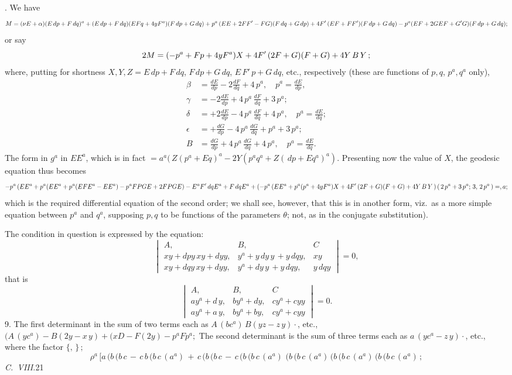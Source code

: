 \documentclass[11pt,a4paper]{book}
\begin{document}
. We have
\[
M = (\nu E + \alpha)(E\,dp + F\,dq)^a + (E\,dp + F\,dq)(EFq + 4yF^a)(F\,dp + G\,dq)\\
+ p^a\,(E E + 2 F F'-F G)(F\,dq + G\,dp)\\
+ 4F'\,(EF + F F')(F\,dp + G\,dq)\\
- p^a(EF + 2 G E F + G' G)(F\,dp + G\,dq);
\]
or say
\[
2M = (-p^a + Fp + 4yF^a) X + 4F'\,(2F + G)(F + G)\\
+ 4 Y\, B\, Y\,;
\]
where, putting for shortness $X, Y, Z = E\,dp + F\,dq$, $F\,dp + G\,dq$, $E\,F'\,p + G\,dq$, etc.,
respectively (these are functions of $p, q$, $p^a, q^a$ only),
\begin{align*}
\beta &= \frac{dE}{dp} - 2\frac{dF}{dq} + 4\,p^a, \quad p^a = \frac{dE}{dp},\\
\gamma &= -2\frac{dE}{dp} + 4\,p^a\,\frac{dF}{dq} + 3\,p^a;\\
\delta &= +2\frac{dE}{dp} - 4\,p^a\,\frac{dF}{dq} + 4\,p^a, \quad p^a = \frac{dE}{dq};\\
\epsilon &= +\frac{dG}{dp} - 4\,p^a\,\frac{dG}{dq} + p^a + 3\,p^a;\\
B &= \frac{dG}{dp} + 4\,p^a\,\frac{dG}{dq} + 4\,p^a, \quad p^a = \frac{dE}{dq}.
\end{align*}
The form in $g^a$ in $EE^a$, which is in fact $= a^a(\,Z(p^a + Eq)^a - 2Y(p^a q^a + Z(\,dp + Eq^a)^a)$.
Presenting now the value of $X$, the geodesic equation thus becomes
\[
- p^a\,(EE^a + p^a(EE^a + p^a(EF E^a - EE^a) - p^a F P G E + 2 F P G E)\\
- E^a F'\,dq E^a + F\,dq E^a\\
+ (-p^a\,(EE^a + p^a(p^a + 4yF^a) X + 4F'\,(2F + G)(F + G)\\
+ 4 Y\,B\, Y\,)\,(\,2\,p^a + 3\,p^a;\,3,\, 2\,p^a\,)=,a;
\]
which is the required differential equation of the second order; we shall see, however,
that this is in another form, viz.\ as a more simple equation between $p^a$ and $q^a$, supposing
$p, q$ to be functions of the parameters $\theta$; not, as in the conjugate substitution).

The condition in question is expressed by the equation:
\[
\begin{vmatrix}
A, & B, & C\\
xy + dp y\,xy + dy y, & y^a + y\,dy\,y\,+ y\,dq y, & xy\\
xy + dq y\,xy + dy y, & y^a + dy\,y\,+ y\,dq y, & y\,dq y
\end{vmatrix} = 0,
\]
that is
\[
\begin{vmatrix}
A, & B, & C\\
ay^a + d\,y, & by^a + dy, & cy^a + cy y\\
ay^a + a\,y, & by^a + by, & cy^a + cy y
\end{vmatrix} = 0.
\]
9. The first determinant in the sum of two terms each as $A\,(bc^a)\,B(yz - z\,y) \cdot$, etc.,
$(A\,(yc^a) - B(2y - x\,y) + (xD - F(2y) - p^a F p^a;$
The second determinant is the sum of three terms each as $a\,(yc^a - z\,y)\cdot$, etc.,
where the factor $\{,\,\}\,;$
\[
\rho^a\,[a\,(b\,(b\,c\,-\,c\,b\,(b\,c\,(a^a)\,+\,c\,(b\,(b\,c\,-\,c\,(b\,(b\,c\,(a^a)\,\,(b\,(b\,c\,(a^a)\,(b\,(b\,c\,(a^a)\,(b\,(b\,c\,(a^a)\,;
\]
\textit{C.\ VIII.}\hfill 21
\end{document}
